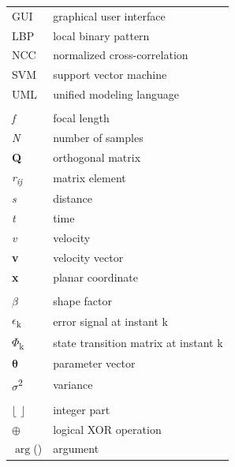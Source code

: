 \header{\headerabbreviations}
\setlongtables
\begin{longtable}[l]{p{3cm}p{}}

    GUI & graphical user interface\\
    LBP & local binary pattern\\
    NCC & normalized cross-correlation\\
    SVM & support vector machine\\
    UML & unified modeling language \\
    \\
    \textit{f} & focal length\\
    \textit{N} & number of samples\\
    \textbf{Q} & orthogonal matrix \\
    \textit{r\textsubscript{ij}} & matrix element \\
    \textit{s} & distance \\
    \textit{t} & time \\
    \textit{v} & velocity \\
    \textbf{v} & velocity vector \\
    \textbf{x} & planar coordinate \\
    \\
    $\beta$ & shape factor \\
    $\epsilon$\textsubscript{k} & error signal at instant k \\
    $\Phi$\textsubscript{k} & state transition matrix at instant k \\
    $\boldsymbol{\theta}$ & parameter vector \\
    $\sigma$\textsuperscript{2} & variance \\
    \\
    $\lfloor$ $\rfloor$ & integer part \\
    $\oplus$ & logical XOR operation \\
    $\arg$() & argument \\

\end{longtable}
\setcounter{table}{0}

